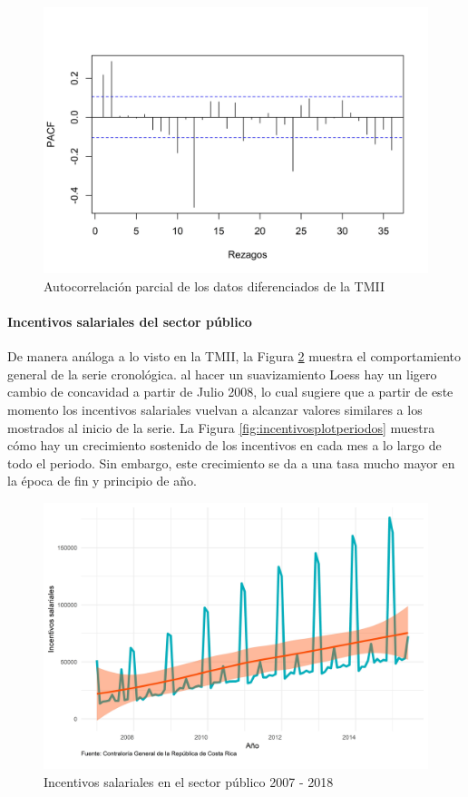 \documentclass[
]{article}
\begin{document}
\begin{figure}[H]
\includegraphics[width=1\linewidth,height=1\textheight]{Tesis_files/figure-latex/tmii_pacf-1} \caption{Autocorrelación parcial de los datos diferenciados de la TMII}\label{fig:tmii_pacf}
\end{figure}

\paragraph{Incentivos salariales del sector público}

De manera análoga a lo visto en la TMII, la Figura
\ref{fig:incentivosplotgeneral} muestra el comportamiento general de la
serie cronológica. al hacer un suavizamiento Loess hay un ligero cambio
de concavidad a partir de Julio 2008, lo cual sugiere que a partir de
este momento los incentivos salariales vuelvan a alcanzar valores
similares a los mostrados al inicio de la serie. La Figura
\ref{fig:incentivosplotperiodos} muestra cómo hay un crecimiento
sostenido de los incentivos en cada mes a lo largo de todo el periodo.
Sin embargo, este crecimiento se da a una tasa mucho mayor en la época
de fin y principio de año.

\begin{figure}[H]
\includegraphics[width=1\linewidth,height=1\textheight]{Tesis_files/figure-latex/incentivosplotgeneral-1} \caption{Incentivos salariales en el sector público 2007 - 2018}\label{fig:incentivosplotgeneral}
\end{figure}
\end{document}
